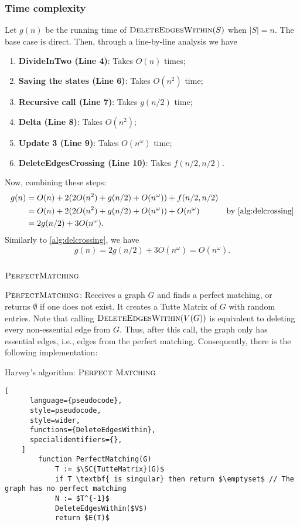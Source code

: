 \subsubsection{Time complexity}
\noindent
Let \(g(n)\) be the running time of \(\textsc{DeleteEdgesWithin}(S)\) when \(|S| = n\).
The base case is direct.
Then, through a line-by-line analysis we have
\begin{enumerate}
  \item \textbf{DivideInTwo (Line 4)}: Takes \(O(n)\) times;
  \item \textbf{Saving the states (Line 6)}: Takes \(O(n^2)\) time;
  \item \textbf{Recursive call (Line 7)}: Takes \(g(n/2)\) time;
  \item \textbf{Delta (Line 8)}: Takes \(O(n^2)\);
  \item \textbf{Update 3 (Line 9)}: Takes \(O(n^\omega)\) time;
  \item \textbf{DeleteEdgesCrossing (Line 10)}: Takes \(f(n/2, n/2)\).
\end{enumerate}
Now, combining these steps:
\begin{align*}
    g(n) &= O(n) + 2 (2O(n^2) + g(n / 2) + O(n^\omega)) + f(n/2, n/2) &  \\
    &= O(n) + 2 (2O(n^2) + g(n / 2) + O(n^\omega)) + O(n^\omega) & \text{by \ref{alg:delcrossing}} \\
    &= 2g(n / 2) + 3O(n^\omega).
\end{align*}
Similarly to \cref{alg:delcrossing}, we have
\begin{equation}
\label{alg:delwithin}
  g(n) = 2g(n / 2) + 3O(n^\omega) = O(n^\omega).
\end{equation}

\subsection{\(\SC{PerfectMatching}\)}

\(\SC{PerfectMatching}\): Receives a graph \(G\) and finds a perfect matching, or returns \(\emptyset\) if one does not exist.
It creates a Tutte Matrix of \(G\) with random entries.
Note that calling \(\textsc{DeleteEdgesWithin}(V(G))\) is equivalent to deleting every non-essential edge from \(G\).
Thus, after this call, the graph only has essential edges, i.e., edges from the perfect matching. 
Consequently, there is the following implementation:

\begin{programruledcaption}{Harvey's algorithm: \(\SC{Perfect Matching}\)}
    \begin{lstlisting}[
      language={pseudocode},
      style=pseudocode,
      style=wider,
      functions={DeleteEdgesWithin},
      specialidentifiers={},
    ]
        function PerfectMatching(G)
            T := $\SC{TutteMatrix}(G)$
            if T \textbf{ is singular} then return $\emptyset$ // The graph has no perfect matching
            N := $T^{-1}$
            DeleteEdgesWithin($V$)
            return $E(T)$
    \end{lstlisting}
\end{programruledcaption}

